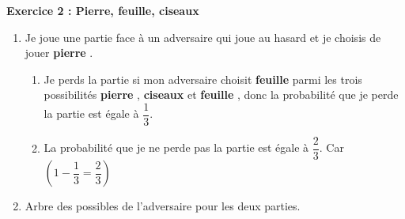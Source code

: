 \textbf{Exercice 2 : Pierre, feuille, ciseaux}

\begin{enumerate}
\item Je joue une partie face à  un adversaire qui joue au hasard et je choisis de jouer \og \textbf{pierre} \fg{}. 
	\begin{enumerate}
		\item Je perds la partie si mon adversaire choisit \og \textbf{feuille} \fg{} parmi les trois \linebreak possibilités \og \textbf{pierre} \fg{}, \og \textbf{ciseaux} \fg{} et \og \textbf{feuille} \fg{}, donc la probabilité que je perde la partie est égale à $\dfrac13$.
		\item La probabilité que je ne perde pas la partie est égale à $\dfrac23$. \quad Car $\left( 1-\dfrac13=\dfrac23\right)$
	\end{enumerate}
\item  Arbre des possibles de l'adversaire pour les deux parties. 

\makeatletter
 

\end{enumerate}

